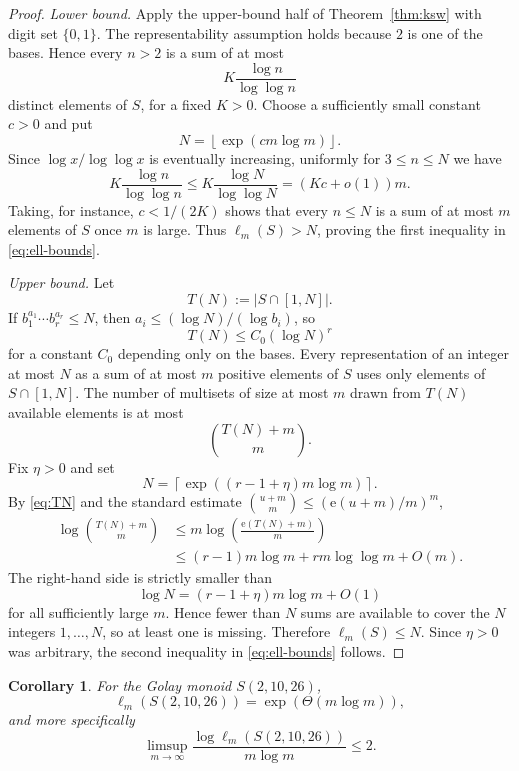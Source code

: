 \documentclass[11pt]{article}
\newtheorem{corollary}[theorem]{Corollary}
\newcommand{\ee}{\mathrm{e}}
\begin{document}
\begin{proof}
\emph{Lower bound.}
Apply the upper-bound half of Theorem~\ref{thm:ksw} with digit set $\{0,1\}$.  The representability assumption holds because $2$ is one of the bases.  Hence every $n>2$ is a sum of at most
\[
K\frac{\log n}{\log\log n}
\]
distinct elements of $S$, for a fixed $K>0$.  Choose a sufficiently small constant $c>0$ and put
\[
N=\left\lfloor\exp(c m\log m)\right\rfloor.
\]
Since $\log x/\log\log x$ is eventually increasing, uniformly for $3\le n\le N$ we have
\[
K\frac{\log n}{\log\log n}
\le
K\frac{\log N}{\log\log N}
=(Kc+o(1))m.
\]
Taking, for instance, $c<1/(2K)$ shows that every $n\le N$ is a sum of at most $m$ elements of $S$ once $m$ is large.  Thus $\ell_m(S)>N$, proving the first inequality in \eqref{eq:ell-bounds}.

\smallskip
\noindent\emph{Upper bound.}
Let
\[
T(N):=|S\cap[1,N]|.
\]
If $b_1^{a_1}\cdots b_r^{a_r}\le N$, then
$a_i\le(\log N)/(\log b_i)$, so
\begin{equation}\label{eq:TN}
T(N)\le C_0(\log N)^r
\end{equation}
for a constant $C_0$ depending only on the bases.  Every representation of an integer at most $N$ as a sum of at most $m$ positive elements of $S$ uses only elements of $S\cap[1,N]$.  The number of multisets of size at most $m$ drawn from $T(N)$ available elements is at most
\[
\binom{T(N)+m}{m}.
\]
Fix $\eta>0$ and set
\[
N=\left\lceil\exp((r-1+\eta)m\log m)\right\rceil.
\]
By \eqref{eq:TN} and the standard estimate
$\binom{u+m}{m}\le (\ee(u+m)/m)^m$,
\begin{align*}
\log\binom{T(N)+m}{m}
&\le m\log\!\left(\frac{\ee(T(N)+m)}{m}\right)\\
&\le (r-1)m\log m+r m\log\log m+O(m).
\end{align*}
The right-hand side is strictly smaller than
\[
\log N=(r-1+\eta)m\log m+O(1)
\]
for all sufficiently large $m$.  Hence fewer than $N$ sums are available to cover the $N$ integers $1,\ldots,N$, so at least one is missing.  Therefore $\ell_m(S)\le N$.  Since $\eta>0$ was arbitrary, the second inequality in \eqref{eq:ell-bounds} follows.
\end{proof}

\begin{corollary}\label{cor:ell-21026}
For the Golay monoid $S(2,10,26)$,
\[
\ell_m(S(2,10,26))=\exp(\Theta(m\log m)),
\]
and more specifically
\[
\limsup_{m\to\infty}
\frac{\log \ell_m(S(2,10,26))}{m\log m}\le2.
\]
\end{corollary}
\end{document}
